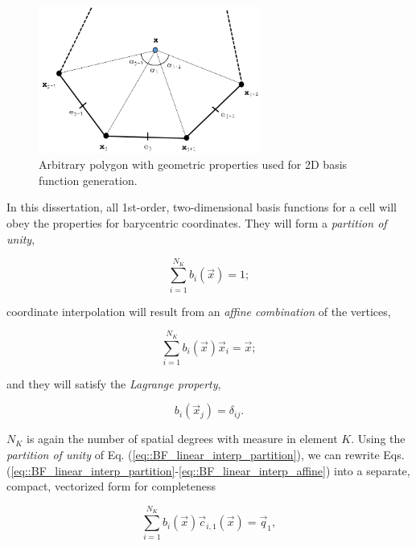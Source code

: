 \begin{figure}[hbt]
\centering
\includegraphics[width=0.65\textwidth]{figures/sec_BF/ref_polygon.png}
\caption{Arbitrary polygon with geometric properties used for 2D basis function generation.}
\label{fig::BF_2D_ref_polygon}
\end{figure}

In this dissertation, all 1st-order, two-dimensional basis functions for a cell will obey the properties for barycentric coordinates. They will form a {\em partition of unity},

\begin{equation}
\sum_{i=1}^{N_K} b_i (\vec{x})  =  1;
\label{eq::BF_linear_interp_partition}
\end{equation}

\noindent coordinate interpolation will result from an {\em affine combination} of the vertices,

\begin{equation}
\sum_{i=1}^{N_K} b_i(\vec{x}) \vec{x}_i  =  \vec{x};
\label{eq::BF_linear_interp_affine}
\end{equation}

\noindent and they will satisfy the {\em Lagrange property},

\begin{equation}
b_i (\vec{x}_j) = \delta_{ij}.
\label{eq::BF_linear_interp_lagrange}
\end{equation}

\noindent $N_K$ is again the number of spatial degrees with measure in element $K$. Using the {\em partition of unity} of Eq. (\ref{eq::BF_linear_interp_partition}), we can rewrite Eqs. (\ref{eq::BF_linear_interp_partition}-\ref{eq::BF_linear_interp_affine}) into a separate, compact, vectorized form for completeness

\begin{equation}
\sum_{i=1}^{N_K}  b_i (\vec{x}) \vec{c}_{i,1}(\vec{x}) = \vec{q}_1 ,
\label{eq::BF_linear_interp_req_vector}
\end{equation}

